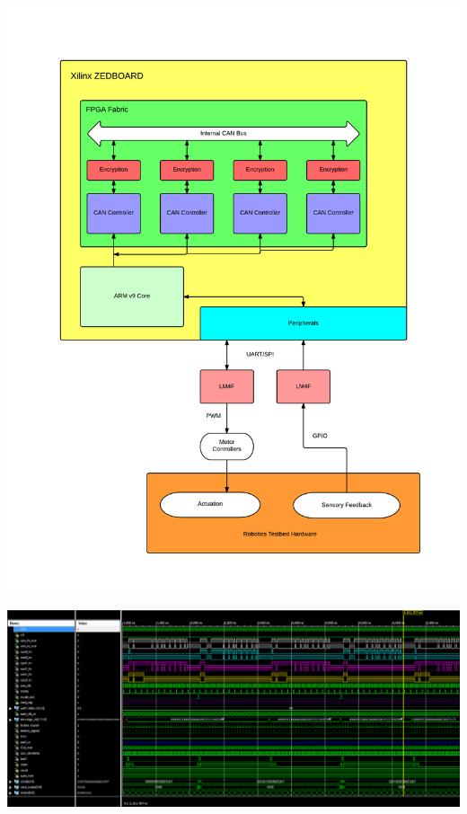 \documentclass[a0,landscape]{a0poster}
\begin{document}
\begin{multicols}{3}
\begin{vwcol}[widths={0.4,0.6}]
\end{vwcol}


\centerline{\includegraphics[scale=0.9]{fpga_layout}}
\vspace{1em}
\centerline{\includegraphics[width=0.9\linewidth]{FPGA_Sim1}}
\vspace{2em}


\end{multicols}
\end{document}

